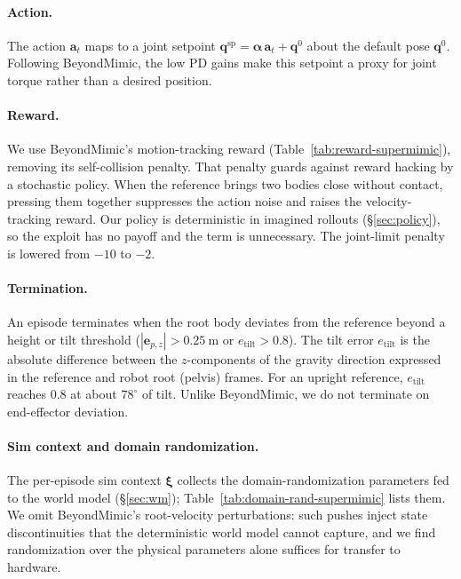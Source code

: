\paragraph{Action.}
The action $\bm{a}_t$ maps to a joint setpoint $\bm{q}^{\text{sp}} = \bm{\alpha}\,\bm{a}_t + \bm{q}^0$ about the default pose $\bm{q}^0$. Following BeyondMimic, the low PD gains make this setpoint a proxy for joint torque rather than a desired position.

\paragraph{Reward.}
We use BeyondMimic's motion-tracking reward (Table~\ref{tab:reward-supermimic}), removing its self-collision penalty. That penalty guards against reward hacking by a stochastic policy. When the reference brings two bodies close without contact, pressing them together suppresses the action noise and raises the velocity-tracking reward. Our policy is deterministic in imagined rollouts (\S\ref{sec:policy}), so the exploit has no payoff and the term is unnecessary. The joint-limit penalty is lowered from $-10$ to $-2$.

\paragraph{Termination.}
An episode terminates when the root body deviates from the reference beyond a height or tilt threshold ($|\bm{e}_{p,z}| > \qty{0.25}{\metre}$ or $e_{\mathrm{tilt}} > 0.8$). The tilt error $e_{\mathrm{tilt}}$ is the absolute difference between the $z$-components of the gravity direction expressed in the reference and robot root (pelvis) frames. For an upright reference, $e_{\mathrm{tilt}}$ reaches 0.8 at about $78^\circ$ of tilt. Unlike BeyondMimic, we do not terminate on end-effector deviation.

\paragraph{Sim context and domain randomization.}
The per-episode sim context $\bm{\xi}$ collects the domain-randomization parameters fed to the world model (\S\ref{sec:wm}); Table~\ref{tab:domain-rand-supermimic} lists them. We omit BeyondMimic's root-velocity perturbations: such pushes inject state discontinuities that the deterministic world model cannot capture, and we find randomization over the physical parameters alone suffices for transfer to hardware.

